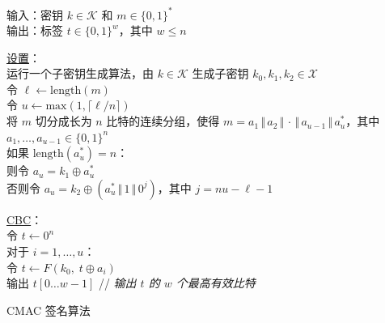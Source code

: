 \begin{table}
	\hspace*{5pt} 输入：密钥 $k\in\mathcal{K}$ 和 $m\in\{0,1\}^*$\\
	\hspace*{26pt} 输出：标签 $t\in\{0,1\}^w$，其中 $w\leq n$

	\vspace{3pt}

	\hspace*{5pt} \underline{设置}：\\
	\hspace*{26pt} 运行一个子密钥生成算法，由 $k\in\mathcal{K}$ 生成子密钥 $k_0,k_1,k_2\in\mathcal{X}$\\
	\hspace*{26pt} 令 $\ell\leftarrow\mathrm{length}(m)$\\
	\hspace*{26pt} 令 $u\leftarrow\mathrm{max}(1,\lceil\ell/n\rceil)$\\
	\hspace*{26pt} 将 $m$ 切分成长为 $n$ 比特的连续分组，使得 $m=a_1\,\Vert\,a_2\,\Vert\,\cdot\,\Vert\,a_{u-1}\,\Vert\,a_u^*$，其中 $a_1,\dots,a_{u-1}\in\{0,1\}^n$\\
	\hspace*{26pt} 如果 $\mathrm{length}(a_u^*)=n$：\\
	\hspace*{50pt} 则令 $a_u=k_1\oplus a_u^*$\\
	\hspace*{50pt} 否则令 $a_u=k_2\oplus(a_u^*\,\Vert\,1\,\Vert\,0^j)$，其中 $j=nu-\ell-1$
	
	\vspace{3pt}
	
	\hspace*{5pt} \underline{CBC}：\\
	\hspace*{26pt} 令 $t\leftarrow0^n$\\
	\hspace*{26pt} 对于 $i=1,\dots,u$：\\
	\hspace*{50pt} 令 $t\leftarrow F(k_0,\;t\oplus a_i)$\\
	\hspace*{26pt} 输出 $t[0\dots w-1]$ \quad\quad\quad\quad\quad // \emph{输出 $t$ 的 $w$ 个最高有效比特}
  \caption{CMAC 签名算法}
  \label{tab:6-1}
\end{table}

